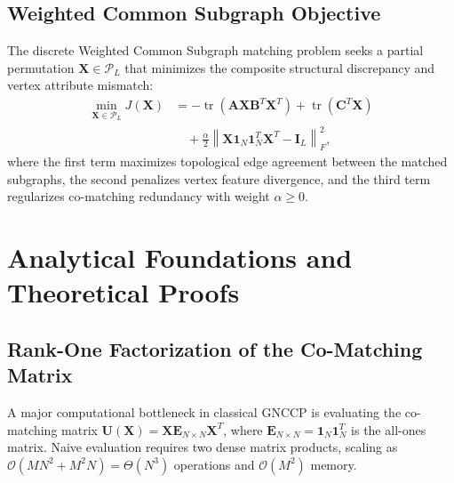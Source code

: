 \documentclass[a4paper,fleqn]{cas-dc}
\theoremstyle{thmstyleone}
\theoremstyle{thmstyletwo}
\theoremstyle{thmstylethree}
\begin{document}
\subsection{Weighted Common Subgraph Objective}
The discrete Weighted Common Subgraph matching problem seeks a partial permutation $\mathbf{X} \in \mathcal{P}_L$ that minimizes the composite structural discrepancy and vertex attribute mismatch:
\begin{align}
\min_{\mathbf{X} \in \mathcal{P}_L} J(\mathbf{X}) &= -\operatorname{tr}\left( \mathbf{A}\mathbf{X}\mathbf{B}^T\mathbf{X}^T \right) + \operatorname{tr}\left( \mathbf{C}^T\mathbf{X} \right) \nonumber \\
&\quad + \frac{\alpha}{2} \left\| \mathbf{X}\mathbf{1}_N\mathbf{1}_N^T\mathbf{X}^T - \mathbf{I}_L \right\|_F^2,
\label{eq:wcs_obj}
\end{align}
where the first term maximizes topological edge agreement between the matched subgraphs, the second penalizes vertex feature divergence, and the third term regularizes co-matching redundancy with weight $\alpha \ge 0$.

\section{Analytical Foundations and Theoretical Proofs}
\label{sec:proofs}

\subsection{Rank-One Factorization of the Co-Matching Matrix}
A major computational bottleneck in classical GNCCP is evaluating the co-matching matrix $\mathbf{U}(\mathbf{X}) = \mathbf{X}\mathbf{E}_{N \times N}\mathbf{X}^T$, where $\mathbf{E}_{N \times N} = \mathbf{1}_N\mathbf{1}_N^T$ is the all-ones matrix. Naive evaluation requires two dense matrix products, scaling as $\mathcal{O}(M N^2 + M^2 N) = \Theta(N^3)$ operations and $\mathcal{O}(M^2)$ memory.
\end{document}
